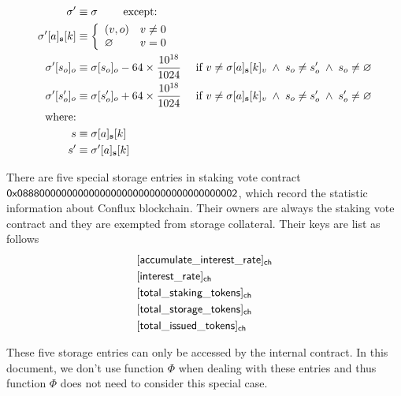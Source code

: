 \begin{align}
	\mathbf{\sigma}'   &\equiv \mathbf{\sigma} \qquad \mbox{  except:}\\ 
	\mathbf{\sigma}'[a]_{\bf s}[k] &\equiv\left\{
		\begin{array}{ll}
			(v,o) & v\neq 0\\
			\varnothing & v= 0\\
		\end{array}
	\right.\\
	\mathbf{\sigma}'[s_o]_o &\equiv \mathbf{\sigma}[s_o]_o - 64 \times \frac{10^{18}}{1024} \quad \mbox{ if } v\neq \mathbf{\sigma}[a]_{\bf s}[k]_v \;\wedge\; s_o\neq s'_o \;\wedge\; s_o\neq\varnothing \\ 
	\mathbf{\sigma}'[s'_o]_o &\equiv \mathbf{\sigma}[s'_o]_o + 64 \times \frac{10^{18}}{1024} \quad \mbox{ if }v\neq \mathbf{\sigma}[a]_{\bf s}[k]_v \;\wedge\; s_o\neq s'_o \;\wedge\; s'_o\neq\varnothing \\ 
	\text{where:} & \\
	s &\equiv \mathbf{\sigma}[a]_{\bf s}[k] \\
	s' &\equiv \mathbf{\sigma}'[a]_{\bf s}[k] 
\end{align}

There are five special storage entries in staking vote contract ${\sf 0x0888000000000000000000000000000000000002}$, which record the statistic information about Conflux blockchain. Their owners are always the staking vote contract and they are exempted from storage collateral. Their keys are list as follows 
\begin{align}
	& \sf [accumulate\char`_interest\char`_rate]_{\sf ch} \\ 
	& \sf [interest\char`_rate]_{\sf ch} \\
    & \sf [total\char`_staking\char`_tokens]_{\sf ch} \\
    & \sf [total\char`_storage\char`_tokens]_{\sf ch} \\
    & \sf [total\char`_issued\char`_tokens]_{\sf ch} 
\end{align}

These five storage entries can only be accessed by the internal contract. In this document, we don't use function $\Phi$ when dealing with these entries and thus function $\Phi$ does not need to consider this special case. 
